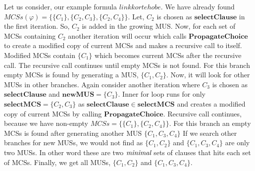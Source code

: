 \begin{example}
	Let us consider, our example formula $link korte hobe$. We have already found $MCSs(\varphi)=\{\{C_{1}\}, \{C_{2}, C_{3}\}, \{C_{2}, C_{4}\}\}$. Let, $C_{2}$ is chosen as $\mathbf{selectClause}$ in the first iteration. So, $C_{2}$ is added in the growing MUS. Now, for each set of MCSs containing $C_{2}$ another iteration will occur which calls $\mathbf{PropagateChoice}$ to create a modified copy of current MCSs and makes a recursive call to itself. Modified MCSs contain $\{C_{1}\}$ which becomes current MCSs after the recursive call. The recursive call continues until empty MCSs is not found. For this branch empty MCSs is found by generating a MUS, $\{C_{1}, C_{2}\}$. Now, it will look for other MUSs in other branches.\newline
	Again consider another iteration where $C_{3}$ is chosen as $\mathbf{selectClause}$ and $\mathbf{newMUS}=\{C_{3}\}$. Inner for loop runs for only $\mathbf{selectMCS}=\{C_{2}, C_{3}\}$ as $\mathbf{selectClause}\in \mathbf{selectMCS}$ and creates a modified copy of current MCSs by calling $\mathbf{PropagateChoice}$. Recursive call continues, because we have non-empty $MCSs=\{\{C_{1}\}, \{C_{2}, C_{4}\}\}$. For this branch an empty MCSs is found after generating another MUS $\{C_{1}, C_{3}, C_{4}\}$
		If we search other branches for new MUSs, we would not find as $\{C_{1}, C_{2}\}$ and $\{C_{1}, C_{3}, C_{4}\}$ are only two MUSs. In other word these are two $\emph{minimal}$ sets of clauses that hits each set of MCSs.
		Finally, we get all MUSs, $\{C_{1}, C_{2}\}$ and $\{C_{1},C_{3}, C_{4}\}$.
\end{example}